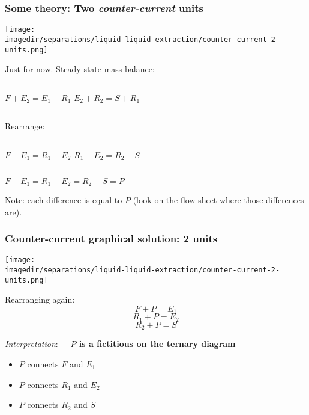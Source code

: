 \begin{frame}\frametitle{Some theory: Two \emph{counter-current} units}
	\begin{center}
		\texttt{[image: \\imagedir/separations/liquid-liquid-extraction/counter-current-2-units.png]}
	\end{center}
	Just \textbf{{\color{myGreen}{consider $N=2$ stages}}} for now. Steady state mass balance:
	\begin{center}
		\begin{columns}[t]
				$F + E_2 = E_1 + R_1$
				$E_2 + R_2 = S + R_1$
		\end{columns}
	\end{center}
	Rearrange:
	\begin{center}		
		\begin{columns}[t]
				$F - E_1 = R_1 - E_2$
				$R_1 - E_2 = R_2 - S$
		\end{columns}
		\vspace{12pt}
		$F - E_1  =  R_1 - E_2 = R_2 - S = P$
	\end{center}
	Note: each difference is equal to $P$ (look on the flow sheet where those differences are).
\end{frame}

\begin{frame}\frametitle{Counter-current graphical solution: 2 units}
	\begin{center}
		\texttt{[image: \\imagedir/separations/liquid-liquid-extraction/counter-current-2-units.png]}
	\end{center}
	
	
	Rearranging again:
	\[	F + P = E_1 \]
	\[	R_1 + P = E_2 \]
	\[	R_2 + P = S \]
	
	
	\emph{Interpretation}: \textbf{~~$P$ is a fictitious {\color{purple}{operating point}} on the ternary diagram}
	\vspace{6pt}
	\begin{itemize}
		\item	$P$ connects $F$ and $E_1$ 
		\item	$P$ connects $R_1$ and $E_2$ 
		\item	$P$ connects $R_2$ and $S$
	\end{itemize}
\end{frame}

